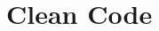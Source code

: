 \documentclass[a4paper,12pt]{report}
\begin{document}
%
%
%

%

%

\chapter{Clean Code\label{chap:CleanCode}}



%



\begin{spacing}{1}


\end{spacing}
\end{document}
